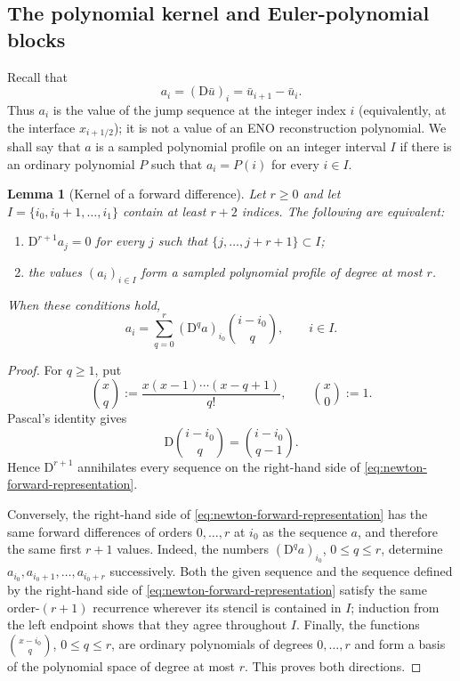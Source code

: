 \documentclass[11pt]{amsart}
\theoremstyle{plain}
\newtheorem{lemma}[theorem]{Lemma}
\theoremstyle{definition}
\theoremstyle{remark}
\numberwithin{equation}{section}
\theoremstyle{plain}
\begin{document}
\subsection{The polynomial kernel and Euler-polynomial blocks}
\label{sec:euler-blocks}

Recall that
\[
a_i=(\mathrm D\bar u)_i=\bar u_{i+1}-\bar u_i.
\]
Thus $a_i$ is the value of the jump sequence at the integer index $i$
(equivalently, at the interface $x_{i+1/2}$); it is not a value of an ENO
reconstruction polynomial.  We shall say that $a$ is a sampled polynomial
profile on an integer interval $I$ if there is an ordinary polynomial $P$
such that $a_i=P(i)$ for every $i\in I$.

\begin{lemma}[Kernel of a forward difference]
	\label{lem:discrete-polynomial-kernel}
	Let $r\ge0$ and let
	$I=\{i_0,i_0+1,\ldots,i_1\}$ contain at least $r+2$ indices.  The
	following are equivalent:
	\begin{enumerate}[label=\textup{(\roman*)}]
		\item $\mathrm D^{r+1}a_j=0$ for every $j$ such that
		$\{j,\ldots,j+r+1\}\subset I$;
		\item the values $(a_i)_{i\in I}$ form a sampled polynomial profile of
		degree at most $r$.
	\end{enumerate}
	When these conditions hold,
	\begin{equation}\label{eq:newton-forward-representation}
		a_i
		=\sum_{q=0}^{r}(\mathrm D^qa)_{i_0}
		\binom{i-i_0}{q},
		\qquad i\in I.
	\end{equation}
\end{lemma}

\begin{proof}
	For $q\ge1$, put
	\[
	\binom{x}{q}
	:=\frac{x(x-1)\cdots(x-q+1)}{q!},
	\qquad
	\binom{x}{0}:=1.
	\]
	Pascal's identity gives
	\begin{equation}\label{eq:newton-basis-difference}
		\mathrm D\binom{i-i_0}{q}
		=\binom{i-i_0}{q-1}.
	\end{equation}
	Hence $\mathrm D^{r+1}$ annihilates every sequence on the right-hand side
	of \eqref{eq:newton-forward-representation}.
	
	Conversely, the right-hand side of
	\eqref{eq:newton-forward-representation} has the same forward differences
	of orders $0,\ldots,r$ at $i_0$ as the sequence $a$, and therefore the same
	first $r+1$ values.  Indeed, the numbers
	$(\mathrm D^qa)_{i_0}$, $0\le q\le r$, determine
	$a_{i_0},a_{i_0+1},\ldots,a_{i_0+r}$ successively.
	Both the given sequence and the sequence defined by the right-hand side
	of \eqref{eq:newton-forward-representation} satisfy the same order-$(r+1)$
	recurrence wherever its stencil is contained in $I$; induction from the left
	endpoint shows that they agree throughout $I$.  Finally, the
	functions $\binom{x-i_0}{q}$, $0\le q\le r$, are ordinary polynomials of
	degrees $0,\ldots,r$ and form a basis of the polynomial space of degree at
	most $r$.  This proves both directions.
\end{proof}
\end{document}
